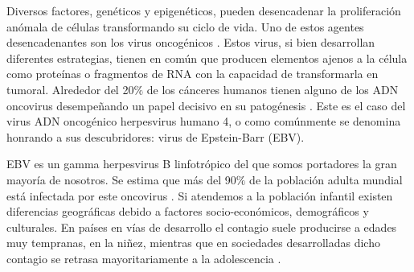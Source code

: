 \documentclass[12pt,letterpaper]{article} %
\begin{document}
Diversos factores, genéticos y epigenéticos, pueden desencadenar la
proliferación anómala de células transformando su ciclo de vida. Uno de estos
agentes desencadenantes son los virus oncogénicos \cite{Gupta2014,Damania2015}. Estos virus,
si bien desarrollan diferentes estrategias, tienen en común que producen
elementos ajenos a la célula como proteínas o fragmentos de RNA con la capacidad
de transformarla en tumoral. Alrededor del 20$\%$ de los cánceres humanos tienen
alguno de los ADN oncovirus desempeñando un papel decisivo en su patogénesis
\cite{Parkin2006,Dayaram2008}. Este es el caso del virus ADN oncogénico herpesvirus humano
4, o como comúnmente se denomina honrando a sus descubridores: virus de
Epstein-Barr (EBV).

EBV es un gamma herpesvirus B linfotrópico del que somos portadores la gran
mayoría de nosotros. Se estima que más del 90$\%$ de la población adulta mundial
está infectada por este oncovirus \cite{Cohen2000}. Si atendemos a la población
infantil existen diferencias geográficas debido a factores socio-económicos, demográficos y
culturales. En países en vías de desarrollo el contagio suele producirse a edades muy
tempranas, en la niñez, mientras que en sociedades desarrolladas dicho contagio
se retrasa mayoritariamente a la adolescencia \cite{Dowd2013}.
\end{document}
